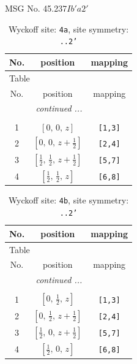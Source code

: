 \documentclass[fleqn,8pt]{jsarticle}
\begin{document}
\setcounter{MaxMatrixCols}{32}

\renewcommand{\tablename}{Table~}
\renewcommand{\figurename}{Figure~}
\begin{center}
\LARGE
MSG No. 45.237\quad$Ib'a2'$
\end{center}
\renewcommand{\arraystretch}{1.2}
\begin{longtable}{ccc}
\caption{Wyckoff site: {\tt 4a}, site symmetry: {\tt ..2'}}
 \\
 \hline \hline
No. & position & mapping \\ \hline \endfirsthead

\multicolumn{2}{l}{\tablename\ \thetable{}} \\
 \hline \hline
No. & position & mapping \\ \hline \endhead

 \hline \hline
\multicolumn{2}{r}{\footnotesize\it continued ...} \\ \endfoot

 \hline \hline
\multicolumn{2}{r}{} \\ \endlastfoot

1 & $\left[ 0,\, 0,\, z \right]$ & {\tt [1,3]} \\ \hline
2 & $\left[ 0,\, 0,\, z + \frac{1}{2} \right]$ & {\tt [2,4]} \\ \hline
3 & $\left[ \frac{1}{2},\, \frac{1}{2},\, z + \frac{1}{2} \right]$ & {\tt [5,7]} \\ \hline
4 & $\left[ \frac{1}{2},\, \frac{1}{2},\, z \right]$ & {\tt [6,8]} \\
\end{longtable}
\renewcommand{\arraystretch}{1.2}
\begin{longtable}{ccc}
\caption{Wyckoff site: {\tt 4b}, site symmetry: {\tt ..2'}}
 \\
 \hline \hline
No. & position & mapping \\ \hline \endfirsthead

\multicolumn{2}{l}{\tablename\ \thetable{}} \\
 \hline \hline
No. & position & mapping \\ \hline \endhead

 \hline \hline
\multicolumn{2}{r}{\footnotesize\it continued ...} \\ \endfoot

 \hline \hline
\multicolumn{2}{r}{} \\ \endlastfoot

1 & $\left[ 0,\, \frac{1}{2},\, z \right]$ & {\tt [1,3]} \\ \hline
2 & $\left[ 0,\, \frac{1}{2},\, z + \frac{1}{2} \right]$ & {\tt [2,4]} \\ \hline
3 & $\left[ \frac{1}{2},\, 0,\, z + \frac{1}{2} \right]$ & {\tt [5,7]} \\ \hline
4 & $\left[ \frac{1}{2},\, 0,\, z \right]$ & {\tt [6,8]} \\
\end{longtable}
\end{document}
